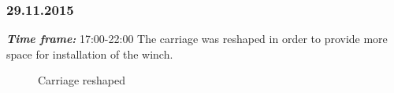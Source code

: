 \subsubsection{29.11.2015}
\textit{\textbf{Time frame:}} 17:00-22:00 \newline
The carriage was reshaped in order to provide more space for installation of the winch.

  	\begin{figure}[H]
  		\begin{minipage}[h]{1\linewidth}
  			\caption{Carriage reshaped}
  		\end{minipage}
  	\end{figure}
  	
